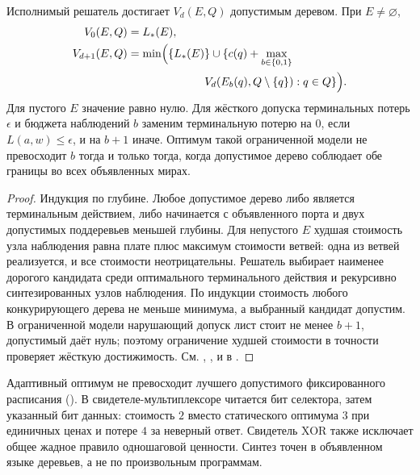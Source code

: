 \begin{theorem}\label{thm:investigation}
Исполнимый решатель достигает $V_d(E,Q)$ допустимым деревом. При $E\ne\varnothing$,
\begin{align}
 V_0(E,Q)&=L_*(E),\\
 V_{d+1}(E,Q)&=\min\Bigl(\{L_*(E)\}\cup\{c(q)+\max_{b\in\{0,1\}} \\
 &\hspace{24mm} V_d(E_b(q),Q\setminus\{q\}):q\in Q\}\Bigr).
\end{align}
Для пустого $E$ значение равно нулю. Для жёсткого допуска терминальных потерь $\epsilon$ и бюджета наблюдений $b$ заменим терминальную потерю на $0$, если $L(a,w)\le\epsilon$, и на $b+1$ иначе. Оптимум такой ограниченной модели не превосходит $b$ тогда и только тогда, когда допустимое дерево соблюдает обе границы во всех объявленных мирах.
\end{theorem}
\begin{proof}
Индукция по глубине. Любое допустимое дерево либо является терминальным действием, либо начинается с объявленного порта и двух допустимых поддеревьев меньшей глубины. Для непустого $E$ худшая стоимость узла наблюдения равна плате плюс максимум стоимости ветвей: одна из ветвей реализуется, и все стоимости неотрицательны. Решатель выбирает наименее дорогого кандидата среди оптимального терминального действия и рекурсивно синтезированных узлов наблюдения. По индукции стоимость любого конкурирующего дерева не меньше минимума, а выбранный кандидат допустим. В ограниченной модели нарушающий допуск лист стоит не менее $b+1$, допустимый даёт нуль; поэтому ограничение худшей стоимости в точности проверяет жёсткую достижимость. См. , ,  и  в .
\end{proof}
Адаптивный оптимум не превосходит лучшего допустимого фиксированного расписания (). В свидетеле-мультиплексоре читается бит селектора, затем указанный бит данных: стоимость $2$ вместо статического оптимума $3$ при единичных ценах и потере $4$ за неверный ответ. Свидетель XOR также исключает общее жадное правило одношаговой ценности. Синтез точен в объявленном языке деревьев, а не по произвольным программам.

